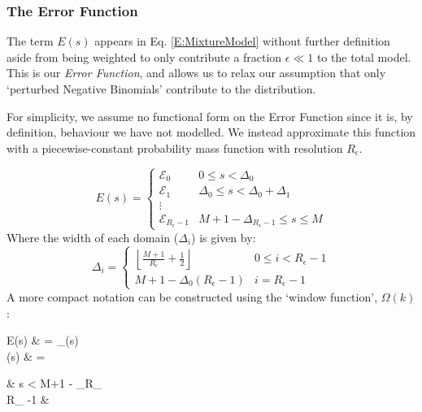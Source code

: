 \documentclass[fleqn,usenatbib]{mnras}
\newcommand{\eref}[1]{Eq. \eqref{#1}}
\begin{document}
{{					\subsubsection{The Error Function}

						The term $E(s)$ appears in \eref{E:MixtureModel} without further definition aside from being weighted to only contribute a fraction $\epsilon \ll 1$ to the total model. This is our \textit{Error Function}, and allows us to relax our assumption that only `perturbed Negative Binomials' contribute to the distribution. 

						For simplicity, we assume no functional form on the Error Function since it is, by definition, behaviour we have not modelled. We instead approximate this function with a piecewise-constant probability mass function with resolution $R_\epsilon$.

						\begin{equation}
							E(s) = \begin{cases}
								\mathcal{E}_0 & 0 \leq s < \Delta_0
								\\
								\mathcal{E}_1 & \Delta_0 \leq s < \Delta_0 + \Delta_1
								\\
								\vdots
								\\
								\mathcal{E}_{R_\epsilon -1} & M +1 - \Delta_{R_\epsilon -1} \leq s \leq M
							\end{cases}
						\end{equation}
						Where the width of each domain ($\Delta_i$) is given by:
						\begin{equation}
							\Delta_i = \begin{cases} 
							\left\lfloor \frac{M+1}{R_\epsilon} + \frac{1}{2} \right\rfloor & 0 \leq i < R_\epsilon -1
							\\
							M +1- \Delta_0 (R_\epsilon -1)& i = R_\epsilon -1
							\end{cases}
						\end{equation}
						A more compact notation can be constructed using the `window function', $\Omega(k)$:
						\begin{spalign}
							E(s) & = _{\Omega(s)}
							\\
							\Omega(s) & = \begin{cases}
								\left\lfloor {} \right\rfloor & s < M+1 - \Delta_{R_}
								\\
								R_{\epsilon} -1 &   
							\end{cases}
						\end{spalign}


}}
\end{document}
